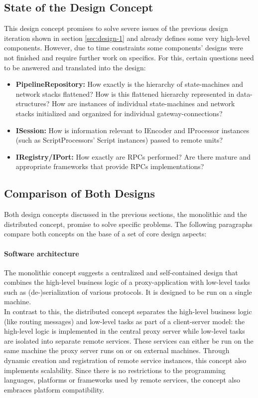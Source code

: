 \subsection{State of the Design Concept}\label{sec:design-2-state} This design concept promises to solve severe issues of the previous design iteration shown in section \ref{sec:design-1} and already defines some very high-level components. However, due to time constraints some components' designs were not  finished and require further work on specifics. For this, certain questions need to be answered and translated into the design:
\begin{itemize}
    \item \textbf{PipelineRepository:} How exactly is the hierarchy of state-machines and network stacks flattened? How is this flattened hierarchy represented in data-structures? How are instances of individual state-machines and network stacks initialized and organized for individual gateway-connections?
    \item \textbf{ISession:} How is information relevant to IEncoder and IProcessor instances (such as ScriptProcessors' Script instances) passed to remote units?
    \item \textbf{IRegistry/IPort:} How exactly are \acp{RPC} performed? Are there mature and appropriate frameworks that provide \acp{RPC} implementations?
\end{itemize}


\subsection{Comparison of Both Designs}
\label{sec:design-comparison}
Both design concepts discussed in the previous sections, the monolithic and the distributed concept, promise to solve specific problems. The following paragraphs compare both concepts on the base of a set of core design aspects:
\paragraph{Software architecture}
The monolithic concept suggests a centralized and self-contained design that combines the high-level business logic of a proxy-application with low-level tasks such as (de-)serialization of various protocols. It is designed to be run on a single machine.\\
In contrast to this, the distributed concept separates the high-level business logic (like routing messages) and low-level tasks as part of a client-server model: the high-level logic is implemented in the central proxy server while low-level tasks are isolated into separate remote services. These services can either be run on the same machine the proxy server runs on or on external machines. Through dynamic creation and registration of remote service instances, this concept also implements scalability. Since there is no restrictions to the programming languages, platforms or frameworks used by remote services, the concept also embraces platform compatibility.
